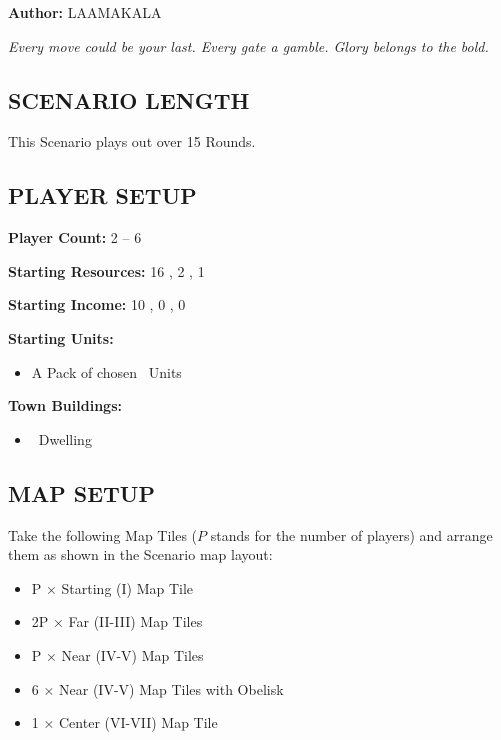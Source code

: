 
\begin{multicols}{2}

\textbf{Author:} LAAMAKALA

\textit{Every move could be your last. Every gate a gamble. Glory belongs to the bold.}

\subsection*{\MakeUppercase{Scenario Length}}
This Scenario plays out over 15 Rounds.

\subsection*{\MakeUppercase{Player Setup}}
\textbf{Player Count:} 2 -- 6

\textbf{Starting Resources:} 16 , 2 , 1 

\textbf{Starting Income:} 10 , 0 , 0 

\textbf{Starting Units:}

\begin{itemize}
  \item A Pack of chosen \bronze\ Units
\end{itemize}

\textbf{Town Buildings:}
\begin{itemize}
  \item \bronze\ Dwelling
\end{itemize}

\subsection*{\MakeUppercase{Map Setup}}
Take the following Map Tiles ($P$ stands for the number of players) and arrange them as shown in the Scenario map layout:

\begin{itemize}
  \item P × Starting (I) Map Tile
  \item 2P × Far (II-III) Map Tiles
  \item P × Near (IV-V) Map Tiles
  \item 6 × Near (IV-V) Map Tiles with Obelisk
  \item 1 × Center (VI-VII) Map Tile
\end{itemize}


\end{multicols}
